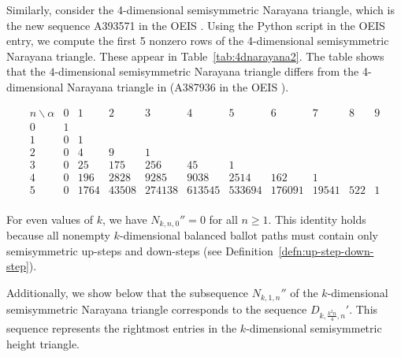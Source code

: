 \documentclass[11pt]{article}
\theoremstyle{remark}
\theoremstyle{definition}
\begin{document}
\medskip
Similarly, consider the 4-dimensional semisymmetric Narayana triangle, which is the new sequence A393571 in the OEIS \cite{oeis}. Using the Python script in the OEIS entry, we compute the first 5 nonzero rows of the 4-dimensional semisymmetric Narayana triangle. These appear in Table~\ref{tab:4dnarayana2}. The table shows that the $4$-dimensional semisymmetric Narayana triangle differs from the 4-dimensional Narayana triangle in \cite{MR5034574} (A387936 in the OEIS  \cite{oeis}).
\begin{table}[H]
\[
\begin{array}{c|cccccccccc}
n \backslash \alpha & 0 & 1 & 2 & 3 & 4 & 5 & 6 & 7 & 8 & 9 \\
\hline
0 & 1\\
1 & 0 & 1 & \\
2& 0 & 4 & 9 & 1\\
3 & 0 & 25 & 175 & 256 & 45 & 1\\
4& 0 & 196 & 2828 & 9285 & 9038 & 2514 & 162 & 1\\
5 & 0 & 1764 & 43508 & 274138 & 613545 & 533694 & 176091 & 19541 & 522 & 1\\
\end{array}
\]
\label{tab:4dnarayana2}
\end{table}

For even values of $k$, we have $N_{k, n, 0}'' = 0$ for all $n \geq 1$. This identity holds because all nonempty $k$-dimensional balanced ballot paths must contain only semisymmetric up-steps and down-steps (see Definition~\ref{defn:up-step-down-step}).

Additionally, we show below that the subsequence $N_{k, 1, n}''$ of the $k$-dimensional semisymmetric Narayana triangle corresponds to the sequence $D_{k, \frac{k^2n}{4}, n}'$. This sequence represents the rightmost entries in the $k$-dimensional semisymmetric height triangle.
\end{document}
